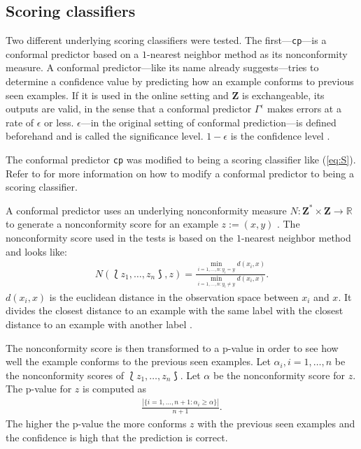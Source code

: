 \documentclass[twoside,11pt]{article}
\def\ds{\Lbag z_1,\dots,z_n \Rbag}
\def\Z{\textbf{Z}}
\begin{document}
\subsection{Scoring classifiers}

Two different underlying scoring classifiers were tested.
The first---\texttt{cp}---is a conformal predictor based
on a $1$-nearest neighbor method as its nonconformity
measure.
A conformal predictor---like its name already
suggests---tries to determine a confidence value by
predicting how an example conforms to previous seen
examples.
If it is used in the online setting and $\Z$ is
exchangeable, its outputs are valid, in the sense that a
conformal predictor $\Gamma^{\epsilon}$ makes errors at
a rate of $\epsilon$ or less.
$\epsilon$---in the original setting of conformal
prediction---is defined beforehand and is called the
significance level. $1-\epsilon$ is the confidence level
\citep[see][]{alrw, fassbender_2019}.

The conformal predictor \texttt{cp} was modified to being a
scoring classifier like (\ref{eq:S}).
Refer to \citet{fassbender_2019} for more information on
how to modify a conformal predictor to being a scoring
classifier.

A conformal predictor uses an underlying nonconformity
measure $N:\Z^* \times \Z \rightarrow \mathbb{R}$ to
generate a nonconformity score for an example $z := (x,y)$
\citep[see][]{alrw, fassbender_2019}.
The nonconformity score used in the tests is based on
the $1$-nearest neighbor method and looks like:
\begin{align*}
  N(\ds, z) = \frac{\min_{i=1,\dots,n:y_i=y}d(x_i, x)}
                   {\min_{i=1,\dots,n:y_i\neq y}d(x_i,x)}.
\end{align*}
$d(x_i, x)$ is the euclidean distance in the observation
space between $x_i$ and $x$. It divides the closest
distance to an example with the same label with the
closest distance to an example with another label
\citep[see][]{fassbender_2019}.

The nonconformity score is then transformed to a p-value
in order to see how well the example conforms to the
previous seen examples. Let $\alpha_i, i=1,\dots,n$ be the
nonconformity scores of $\ds$. Let $\alpha$ be the
nonconformity score for $z$. The p-value for $z$ is
computed as
\begin{align*}
  \frac{|\{i=1,\dots,n+1: \alpha_i \geq \alpha\}|}{n + 1}.
\end{align*}
The higher the p-value the more conforms $z$ with the
previous seen examples and the confidence is high that the
prediction is correct.
\end{document}
